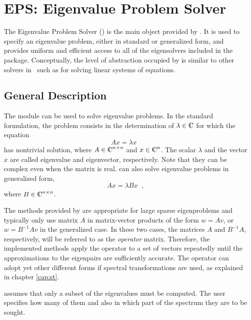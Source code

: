 \chapter{\label{cap:eps}EPS: Eigenvalue Problem Solver}

\noindent The Eigenvalue Problem Solver () is the main object provided by \slepc. It is used to specify an eigenvalue problem, either in standard or generalized form, and provides uniform and efficient access to all of the eigensolvers included in the package. Conceptually, the level of abstraction occupied by  is similar to other solvers in \petsc\ such as  for solving linear systems of equations.
	
\section{General Description}

	The  module can be used to solve eigenvalue problems. In the standard formulation, the problem consists in the determination of $\lambda\in\Co$ for which the equation
\begin{equation}Ax=\lambda x\;\;\end{equation}
has nontrivial solution, where $A\in\Co^{n\times n}$ and $x \in \Co^n$. The scalar $\lambda$ and the vector $x$ are called eigenvalue and eigenvector, respectively. Note that they can be complex even when the matrix is real.
\slepc can also solve eigenvalue problems in generalized form,
\begin{equation}Ax=\lambda Bx\;\;,\end{equation}
where $B\in\Co^{n\times n}$.

	The methods provided by \slepc are appropriate for large sparse eigenproblems and typically only use matrix $A$ in matrix-vector products of the form $w=Av$, or $w=B^{-1}\!Av$ in the generalized case. In these two cases, the matrices $A$ and $B^{-1}\!A$, respectively, will be referred to as the {\em operator\/} matrix. Therefore, the implemented methods apply the operator to a set of vectors repeatedly until the approximations to the eigenpairs are sufficiently accurate. The operator can adopt yet other different forms if spectral transformations are used, as explained in chapter \ref{cap:st}.

	\slepc assumes that only a subset of the eigenvalues must be computed. The user specifies how many of them and also in which part of the spectrum they are to be sought.
	
